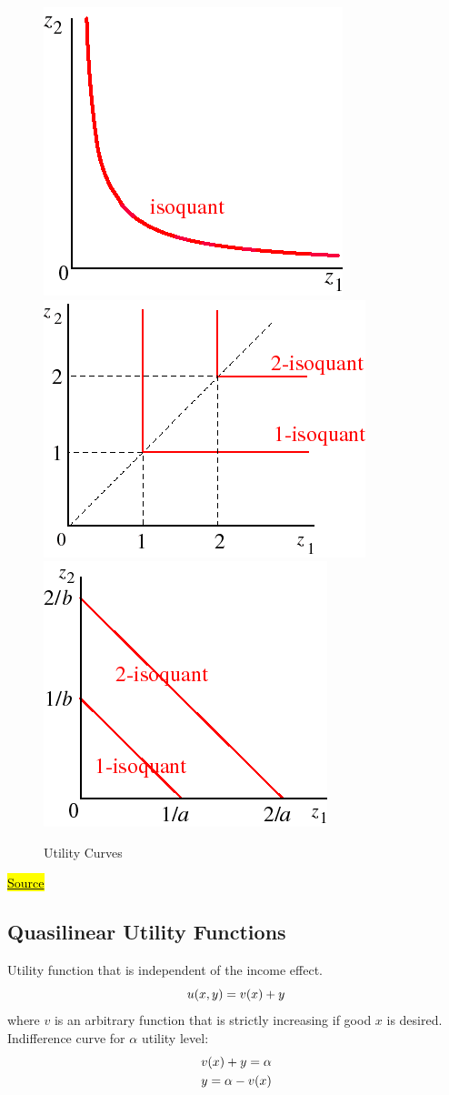 \documentclass[a4paper, 12pt, reqno]{article}
\begin{document}
\begin{figure}[htp]
    \centering
    \includegraphics[width=.3\textwidth]{./Curves/CD.png}\hfill
    \includegraphics[width=.3\textwidth]{./Curves/C.png}\hfill
    \includegraphics[width=.3\textwidth]{./Curves/S.png}  
    \caption{Utility Curves}
    \label{fig:Utility Curves} 
\end{figure}  

\href{https://en.wikipedia.org/wiki/Constant_elasticity_of_substitution}{\hl{Source}}

\subsection{Quasilinear Utility Functions}
Utility function that is independent of the income effect. 
\begin{equation}
    u(x,y) = v(x) + y
    \notag
\end{equation}
where $v$ is an arbitrary function that is strictly increasing if good $x$ is desired. \\
Indifference curve for $\alpha$ utility level:
\begin{equation}
\begin{split}    
    &v(x) + y = \alpha  \\
    &y = \alpha - v(x)
    \notag 
    \end{split}   
\end{equation} 
\end{document}
